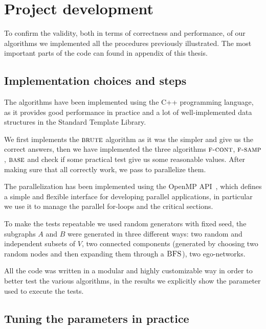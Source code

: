 
\chapter{Project development}
    
    To confirm the validity, both in terms of correctness and performance, of our algorithms we implemented all the procedures previously illustrated. 
    The most important parts of the code can found in appendix of this thesis.
    
    \section{Implementation choices and steps}
    
    The algorithms have been implemented using the C++ programming language, as it provides good performance in practice and a lot of well-implemented data structures in the Standard Template Library.\medskip
    
    We first implements the $\textsc{brute}$ algorithm as it was the simpler and give us the correct answers, then we have implemented the three algorithms $\textsc{f-cont}$, $\textsc{f-samp}$, $\textsc{base}$ and check if some practical test give us some reasonable values.
    After making sure that all correctly work, we pass to parallelize them.\medskip
    
    The parallelization has been implemented using the OpenMP API~\cite{openmp}, which defines a simple and flexible interface for developing parallel applications, in particular we use it to manage the parallel for-loops and the critical sections.\medskip
    
    To make the tests repeatable we used random generators with fixed seed, the subgraphs $A$ and $B$ were generated in three different ways: two random and independent subsets of $V$, two connected components (generated by choosing two random nodes and then expanding them through a $\textsc{BFS}$), two ego-networks.\medskip
    
    All the code was written in a modular and highly customizable way in order
    to better test the various algorithms, in the results we explicitly show the parameter used to execute the tests.
    
    \clearpage
    
    \section{Tuning the parameters in practice}
    
